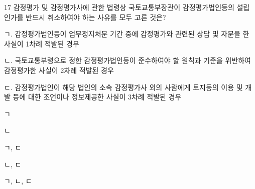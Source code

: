 \begin{question}{17}
감정평가 및 감정평가사에 관한 법령상 국토교통부장관이 감정평가법인등의 설립 인가를 반드시 취소하여야 하는 사유를 모두 고른 것은?
\begin{framedtext}
ㄱ. 감정평가법인등이 업무정지처분 기간 중에 감정평가와 관련된 상담 및 자문을 한 사실이 1차례 적발된 경우 \par
ㄴ. 국토교통부령으로 정한 감정평가법인등이 준수하여야 할 원칙과 기준을 위반하여 감정평가한 사실이 2차례 적발된 경우 \par
ㄷ. 감정평가법인이 해당 법인의 소속 감정평가사 외의 사람에게 토지등의 이용 및 개발 등에 대한 조언이나 정보제공한 사실이 3차례 적발된 경우
\end{framedtext}
\begin{choices}
  \item ㄱ
  \item ㄴ
  \item ㄱ, ㄷ
  \item ㄴ, ㄷ
  \item ㄱ, ㄴ, ㄷ
\end{choices}
\end{question}
